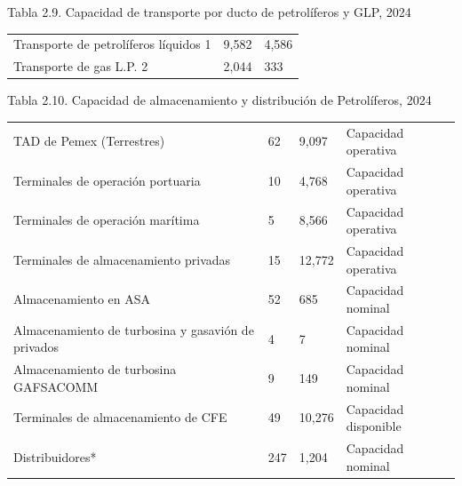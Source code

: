 \documentclass{sener2025}
\begin{document}
\begin{tabladoradoCorto}
  \caption{Tabla 2.9. Capacidad de transporte por ducto de petrolíferos y GLP, 2024}
  \label{tab:tabla_2_9__capacidad_de_transp}
  \begin{tabularx}{\textwidth}{Vvv}
    \toprule
      &  &  \\
    \midrule
    Transporte de petrolíferos líquidos 1 & 9,582 & 4,586 \\
    Transporte de gas L.P. 2 & 2,044 & 333 \\
    \bottomrule
  \end{tabularx}
\end{tabladoradoCorto}
\vspace{-4pt}

\begin{tabladoradoCorto}
  \caption{Tabla 2.10. Capacidad de almacenamiento y distribución de Petrolíferos, 2024}
  \label{tab:tabla_2_10__capacidad_de_almac}
  \begin{tabularx}{\textwidth}{Vvvv}
    \toprule
      &  &  & \encabezadodorado{} \\
    \midrule
    TAD de Pemex (Terrestres) & 62 & 9,097 & Capacidad operativa \\
    Terminales de operación portuaria & 10 & 4,768 & Capacidad operativa \\
    Terminales de operación marítima & 5 & 8,566 & Capacidad operativa \\
    Terminales de almacenamiento privadas & 15 & 12,772 & Capacidad operativa \\
    Almacenamiento en ASA & 52 & 685 & Capacidad nominal \\
    Almacenamiento de turbosina y gasavión de privados & 4 & 7 & Capacidad nominal \\
    Almacenamiento de turbosina GAFSACOMM & 9 & 149 & Capacidad nominal \\
    Terminales de almacenamiento de CFE & 49 & 10,276 & Capacidad disponible \\
    Distribuidores* & 247 & 1,204 & Capacidad nominal \\
    \bottomrule
  \end{tabularx}
\end{tabladoradoCorto}
\vspace{-4pt}
\end{document}
